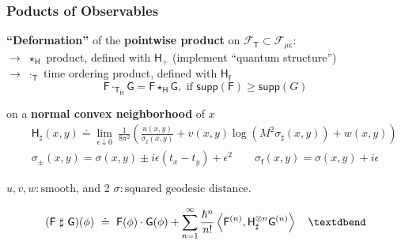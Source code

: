 \documentclass[9pt]{beamer}
\newcommand{\TdotH}{\cdot_{\Tsf_\Hsf}} %
\newcommand{\Smearip}[1]{\left\langle #1 \right\rangle} %
\newcommand{\supp}{\mathsf{supp}} %
\newcommand{\Fcal}{\mathcal{F}}
\newcommand{\Fsf}{\mathsf{F}}
\newcommand{\Gsf}{\mathsf{G}}
\newcommand{\Hsf}{\mathsf{H}}
\newcommand{\Tsf}{\mathsf{T}}
\newcommand{\csf}{\mathsf{c}}
\newcommand{\fsf}{\mathsf{f}}
\begin{document}

\begin{frame}[label=products]

\frametitle{Poducts of Observables}

\textbf{``Deformation''} of the \textbf{pointwise product} on $\Fcal_\Tsf \subset \Fcal_{\mu\csf}$: \\
$\to$ $\star_\Hsf$ product, defined with $\Hsf_+$ (implement ``quantum structure'') \\
$\to$ $\cdot_\Tsf$ time ordering product, defined with $\Hsf_\fsf$ 
\vspace*{-8pt}
\begin{equation*}
\Fsf \TdotH \Gsf = \Fsf \star_\Hsf \Gsf, \mbox{ if } \supp(\Fsf) \geq \supp(G)
\end{equation*}
\vspace*{-20pt}
\begin{exampleblock}{on a \textbf{normal convex neighborhood} of $x$} 
\vspace*{-18pt}
\begin{eqnarray*}
&& \Hsf_\sharp(x,y) \doteq \lim_{\epsilon \downarrow 0} \ \frac{1}{8\pi^2}\left(\frac{u(x,y)}{\sigma_\sharp(x,y)}+v(x,y)\log(M^2 \sigma_\sharp(x,y))+w(x,y)\right) \\[6pt]
&& \sigma_\pm(x,y) = \sigma(x,y) \pm i\epsilon(t_x-t_y) + \epsilon^2 \qquad \sigma_\fsf(x,y) = \sigma(x,y) + i\epsilon 
\end{eqnarray*}
\vspace*{-14pt}
\end{exampleblock}
\vspace*{-4pt}
$u,v,w:  \mbox{smooth}$, and 2 $\sigma: \mbox{squared geodesic distance}$.
\vspace*{-6pt}


\begin{block}{}
\vspace*{-14pt}
\begin{equation*}
(\Fsf \ \sharp \ \Gsf)(\phi) \ \doteq \ \Fsf(\phi) \cdot \Gsf(\phi) + \sum_{n=1}^{\infty} \frac{\hbar^n}{n!} \Smearip{\Fsf^{(n)},\Hsf_{\sharp}^{\otimes n} \Gsf^{(n)}} \quad \textdbend  
\vspace*{-10pt}
\end{equation*}
\hfill \hyperlink{details_products}{}
\end{block}


\end{frame}
\end{document}
